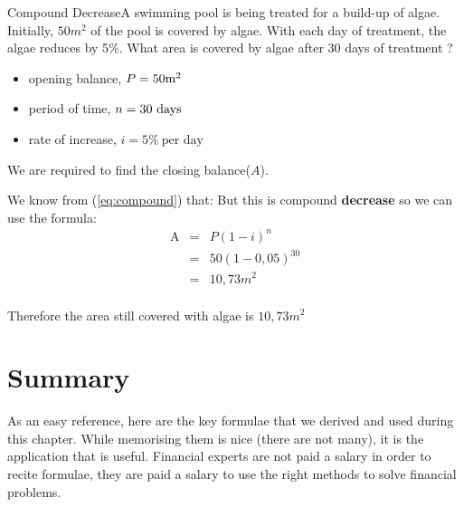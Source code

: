 \documentclass[10pt,a4paper,titlepage,twoside,openright]{report}
\begin{document}
\begin{wex}{Compound Decrease}{A swimming pool is being treated for a build-up of algae.  Initially, $50 m^2$ of the pool is covered by algae.  With each day of treatment, the algae reduces by 5\%.  What area is covered by algae after 30 days of treatment ?}{
\begin{itemize}[topsep=0ex, partopsep=\parskip,itemsep=\parskip]
\item{opening balance, $P=50 \rm{m^2}$}
\item{period of time, $n=30~\rm{days}$}
\item{rate of increase, $i=5\%~\mbox{per day}$}
\end{itemize}
\vspace{0.5cm}
We are required to find the closing balance($A$). 

We know from (\ref{eq:compound}) that:
But this is compound \textbf{decrease} so we can use the formula:
\begin{eqnarray*}
\mbox{A}&=& P (1 - i)^n\\
&=& 50(1 - 0,05)^{30}\\
&=& 10,73 m^2\\
\end{eqnarray*}

Therefore the area still covered with algae is $10,73 m^2$
}
\end{wex}



\section{Summary}
As an easy reference, here are the key formulae that we derived and used during this chapter. While memorising them is nice (there are not many), it is the application that is useful. Financial experts are not paid a salary in order to recite formulae, they are paid a salary to use the right methods to solve financial problems.
\end{document}
